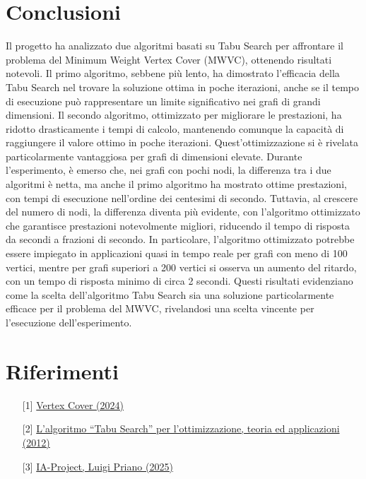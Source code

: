 \documentclass[12pt,a4paper,twoside]{article}
\begin{document}
\section{Conclusioni}
Il progetto ha analizzato due algoritmi basati su Tabu Search per affrontare il problema del Minimum Weight Vertex Cover (MWVC), ottenendo risultati notevoli. Il primo algoritmo, sebbene più lento, ha dimostrato l'efficacia della Tabu Search nel trovare la soluzione ottima in poche iterazioni, anche se il tempo di esecuzione può rappresentare un limite significativo nei grafi di grandi dimensioni. Il secondo algoritmo, ottimizzato per migliorare le prestazioni, ha ridotto drasticamente i tempi di calcolo, mantenendo comunque la capacità di raggiungere il valore ottimo in poche iterazioni. Quest'ottimizzazione si è rivelata particolarmente vantaggiosa per grafi di dimensioni elevate. Durante l'esperimento, è emerso che, nei grafi con pochi nodi, la differenza tra i due algoritmi è netta, ma anche il primo algoritmo ha mostrato ottime prestazioni, con tempi di esecuzione nell'ordine dei centesimi di secondo. Tuttavia, al crescere del numero di nodi, la differenza diventa più evidente, con l'algoritmo ottimizzato che garantisce prestazioni notevolmente migliori, riducendo il tempo di risposta da secondi a frazioni di secondo. In particolare, l'algoritmo ottimizzato potrebbe essere impiegato in applicazioni quasi in tempo reale per grafi con meno di 100 vertici, mentre per grafi superiori a 200 vertici si osserva un aumento del ritardo, con un tempo di risposta minimo di circa 2 secondi.
Questi risultati evidenziano come la scelta dell'algoritmo Tabu Search sia una soluzione particolarmente efficace per il problema del MWVC, rivelandosi una scelta vincente per l'esecuzione dell'esperimento.
\section{Riferimenti}
\begin{enumerate}
    \item[{[1]}] \label{1} \href{https://en.wikipedia.org/wiki/Vertex_cover}{Vertex Cover (2024)}
    \item[{[2]}] \label{2} \href{https://thesis.unipd.it/retrieve/72861d68-61b5-45f6-94af-a86b25726440/tesi_Tabu_Search_21.2.2112.pdf}{L’algoritmo “Tabu Search” per l’ottimizzazione, teoria ed applicazioni (2012)}
    \item[{[3]}] \label{3} \href{https://github.com/Luigi018/IA-Project}{IA-Project, Luigi Priano (2025)}
\end{enumerate}
\printindex
\end{document}
